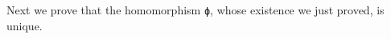 \begin{code}
\AgdaSpace{}%
\AgdaSpace{}%
\AgdaSpace{}%
\AgdaSpace{}%
\<%
\\
%
\>[2]\AgdaSpace{}%
\AgdaSymbol{=}\AgdaSpace{}%
\<%
\\
%
\\[\AgdaEmptyExtraSkip]%
%
\>[2]\AgdaSpace{}%
\AgdaSymbol{:}\AgdaSpace{}%
\AgdaSpace{}%
\<%
\\
%
\>[2]\AgdaSpace{}%
\AgdaSymbol{=}\AgdaSpace{}%
\AgdaSpace{}%
\AgdaSpace{}%
\AgdaSpace{}%
\<%
\end{code}
\ccpad
Next we prove that the homomorphism \texttt{ϕ}, whose existence we just
proved, is unique.
\ccpad
